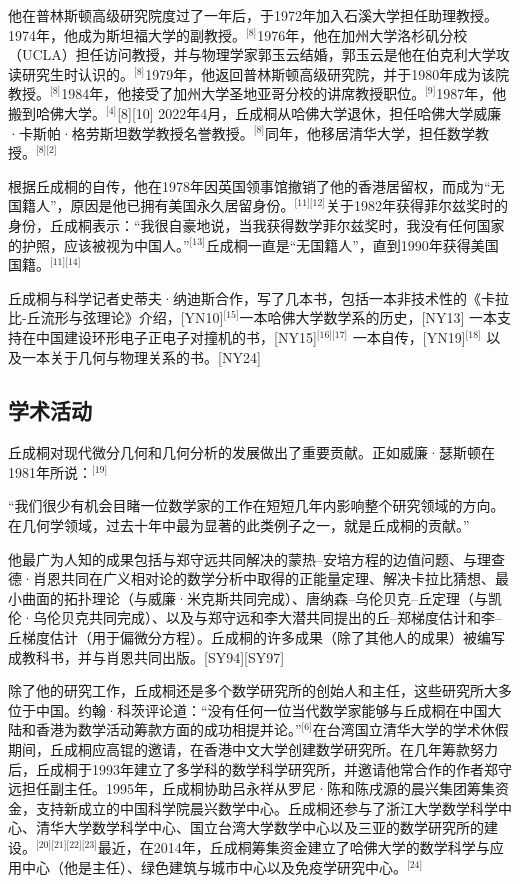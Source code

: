 他在普林斯顿高级研究院度过了一年后，于1972年加入石溪大学担任助理教授。1974年，他成为斯坦福大学的副教授。\(^\text{[8]}\)1976年，他在加州大学洛杉矶分校（UCLA）担任访问教授，并与物理学家郭玉云结婚，郭玉云是他在伯克利大学攻读研究生时认识的。\(^\text{[8]}\)1979年，他返回普林斯顿高级研究院，并于1980年成为该院教授。\(^\text{[8]}\)1984年，他接受了加州大学圣地亚哥分校的讲席教授职位。\(^\text{[9]}\)1987年，他搬到哈佛大学。\(^\text{[4]}\)[8][10] 2022年4月，丘成桐从哈佛大学退休，担任哈佛大学威廉·卡斯帕·格劳斯坦数学教授名誉教授。\(^\text{[8]}\)同年，他移居清华大学，担任数学教授。\(^\text{[8][2]}\)

根据丘成桐的自传，他在1978年因英国领事馆撤销了他的香港居留权，而成为“无国籍人”，原因是他已拥有美国永久居留身份。\(^\text{[11][12]}\)关于1982年获得菲尔兹奖时的身份，丘成桐表示：“我很自豪地说，当我获得数学菲尔兹奖时，我没有任何国家的护照，应该被视为中国人。”\(^\text{[13]}\)丘成桐一直是“无国籍人”，直到1990年获得美国国籍。\(^\text{[11][14]}\)

丘成桐与科学记者史蒂夫·纳迪斯合作，写了几本书，包括一本非技术性的《卡拉比-丘流形与弦理论》介绍，[YN10]\(^\text{[15]}\)一本哈佛大学数学系的历史，[NY13] 一本支持在中国建设环形电子正电子对撞机的书，[NY15]\(^\text{[16][17]}\) 一本自传，[YN19]\(^\text{[18]}\) 以及一本关于几何与物理关系的书。[NY24]
\subsection{学术活动}  
丘成桐对现代微分几何和几何分析的发展做出了重要贡献。正如威廉·瑟斯顿在1981年所说：\(^\text{[19]}\)

“我们很少有机会目睹一位数学家的工作在短短几年内影响整个研究领域的方向。在几何学领域，过去十年中最为显著的此类例子之一，就是丘成桐的贡献。”

他最广为人知的成果包括与郑守远共同解决的蒙热–安培方程的边值问题、与理查德·肖恩共同在广义相对论的数学分析中取得的正能量定理、解决卡拉比猜想、最小曲面的拓扑理论（与威廉·米克斯共同完成）、唐纳森–乌伦贝克–丘定理（与凯伦·乌伦贝克共同完成）、以及与郑守远和李大潜共同提出的丘–郑梯度估计和李–丘梯度估计（用于偏微分方程）。丘成桐的许多成果（除了其他人的成果）被编写成教科书，并与肖恩共同出版。[SY94][SY97]

除了他的研究工作，丘成桐还是多个数学研究所的创始人和主任，这些研究所大多位于中国。约翰·科茨评论道：“没有任何一位当代数学家能够与丘成桐在中国大陆和香港为数学活动筹款方面的成功相提并论。”\(^\text{[6]}\)在台湾国立清华大学的学术休假期间，丘成桐应高锟的邀请，在香港中文大学创建数学研究所。在几年筹款努力后，丘成桐于1993年建立了多学科的数学科学研究所，并邀请他常合作的作者郑守远担任副主任。1995年，丘成桐协助吕永祥从罗尼·陈和陈戌源的晨兴集团筹集资金，支持新成立的中国科学院晨兴数学中心。丘成桐还参与了浙江大学数学科学中心、清华大学数学科学中心、国立台湾大学数学中心以及三亚的数学研究所的建设。\(^\text{[20][21][22][23]}\)最近，在2014年，丘成桐筹集资金建立了哈佛大学的数学科学与应用中心（他是主任）、绿色建筑与城市中心以及免疫学研究中心。\(^\text{[24]}\)

